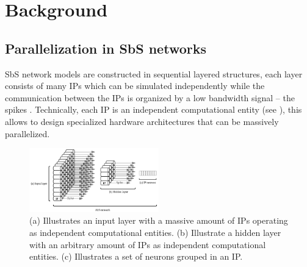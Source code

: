 \section{Background}



\subsection{Parallelization in SbS networks}
SbS network models are constructed in sequential layered structures, each layer consists of many IPs which can be simulated independently while the communication between the IPs is organized by a low bandwidth signal -- the spikes \cite{Rotermund500280}. Technically, each IP is an independent computational entity (see ), this allows to design specialized hardware architectures that can be massively parallelized.

\begin{figure}
	\centering
	\includegraphics[width=0.5\textwidth]{../figures/SbS_layer.pdf}
	\caption{(a) Illustrates an input layer with a massive amount of IPs operating as independent computational entities. (b) Illustrate a hidden layer with an arbitrary amount of IPs as independent computational entities. (c) Illustrates a set of neurons grouped in an IP. }
	\label{fig:SbS_layer}
\end{figure}